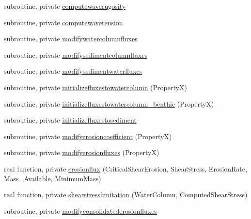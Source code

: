 \begin{DoxyCompactItemize}
\item 
subroutine, private \mbox{\hyperlink{namespacemoduleinterfacesedimentwater_a25379264e67d8f64f1b5eb254353c22f}{computewaverugosity}}
\item 
subroutine, private \mbox{\hyperlink{namespacemoduleinterfacesedimentwater_a8334efc0d8743e6adfd52831e97bb260}{computewavetension}}
\item 
subroutine, private \mbox{\hyperlink{namespacemoduleinterfacesedimentwater_a052aa500f3fe487c32cb93f8c5a8ea60}{modifywatercolumnfluxes}}
\item 
subroutine, private \mbox{\hyperlink{namespacemoduleinterfacesedimentwater_aa69ad0cf59fc330de29ad9983648c806}{modifysedimentcolumnfluxes}}
\item 
subroutine, private \mbox{\hyperlink{namespacemoduleinterfacesedimentwater_a3c912328a57c38e146a0449318c3ace0}{modifysedimentwaterfluxes}}
\item 
subroutine, private \mbox{\hyperlink{namespacemoduleinterfacesedimentwater_ad957168b604568b1c6165e52a78a03c6}{initializefluxestowatercolumn}} (PropertyX)
\item 
subroutine, private \mbox{\hyperlink{namespacemoduleinterfacesedimentwater_a255d03cbe0cabfd03178e57925298607}{initializefluxestowatercolumn\+\_\+benthic}} (PropertyX)
\item 
subroutine, private \mbox{\hyperlink{namespacemoduleinterfacesedimentwater_a3daecfd36630da785ff12a9ea8c61064}{initializefluxestosediment}}
\item 
subroutine, private \mbox{\hyperlink{namespacemoduleinterfacesedimentwater_aae597d2dbf7b3014156d4fb4815b25bb}{modifyerosioncoefficient}} (PropertyX)
\item 
subroutine, private \mbox{\hyperlink{namespacemoduleinterfacesedimentwater_a26bb67acd49cf811c778aa020cef0f2a}{modifyerosionfluxes}} (PropertyX)
\item 
real function, private \mbox{\hyperlink{namespacemoduleinterfacesedimentwater_a564b97311dc02a020ceaabdd4192ae46}{erosionflux}} (Critical\+Shear\+Erosion, Shear\+Stress, Erosion\+Rate, Mass\+\_\+\+Available, Minimum\+Mass)
\item 
real function, private \mbox{\hyperlink{namespacemoduleinterfacesedimentwater_ab99914cb84ad28c9ff3848ff2f65536b}{shearstresslimitation}} (Water\+Column, Computed\+Shear\+Stress)
\item 
subroutine, private \mbox{\hyperlink{namespacemoduleinterfacesedimentwater_a15dcf3dbb1639d562e8cfd2115b95c41}{modifyconsolidatederosionfluxes}}
\item 

\end{DoxyCompactItemize}
